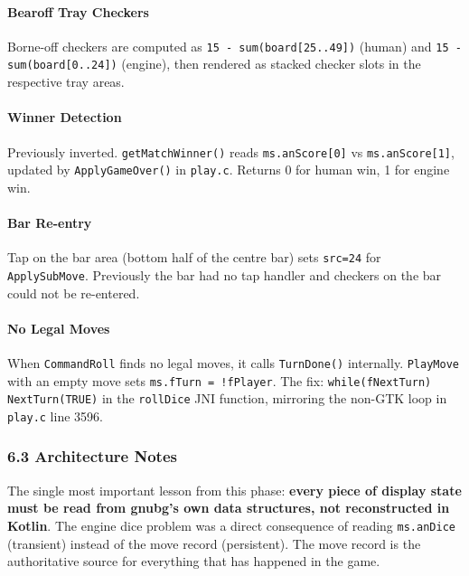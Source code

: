 \documentclass[11pt,a4paper]{article}
\begin{document}
\paragraph{Bearoff Tray Checkers}

Borne-off checkers are computed as \texttt{15 - sum(board[25..49])}
(human) and \texttt{15 - sum(board[0..24])} (engine), then rendered
as stacked checker slots in the respective tray areas.

\paragraph{Winner Detection}

Previously inverted. \texttt{getMatchWinner()} reads
\texttt{ms.anScore[0]} vs \texttt{ms.anScore[1]}, updated by
\texttt{ApplyGameOver()} in \texttt{play.c}. Returns 0 for human win,
1 for engine win.

\paragraph{Bar Re-entry}

Tap on the bar area (bottom half of the centre bar) sets \texttt{src=24}
for \texttt{ApplySubMove}. Previously the bar had no tap handler and
checkers on the bar could not be re-entered.

\paragraph{No Legal Moves}

When \texttt{CommandRoll} finds no legal moves, it calls
\texttt{TurnDone()} internally. \texttt{PlayMove} with an empty move
sets \texttt{ms.fTurn = !fPlayer}. The fix: \texttt{while(fNextTurn)
NextTurn(TRUE)} in the \texttt{rollDice} JNI function, mirroring the
non-GTK loop in \texttt{play.c} line 3596.

\subsubsection{6.3 Architecture Notes}\label{arch-v086}

The single most important lesson from this phase: \textbf{every piece of
display state must be read from gnubg's own data structures, not
reconstructed in Kotlin}. The engine dice problem was a direct consequence
of reading \texttt{ms.anDice} (transient) instead of the move record
(persistent). The move record is the authoritative source for everything
that has happened in the game.
\end{document}
